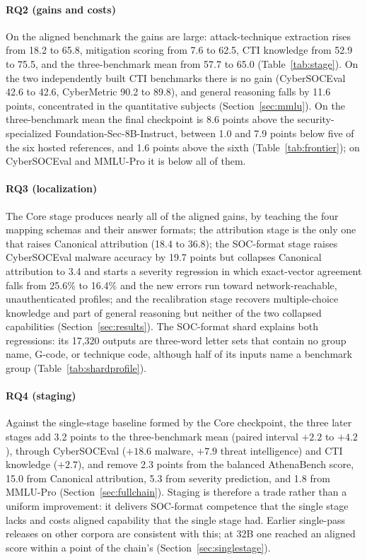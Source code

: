 \documentclass[twocolumn]{svjour3}
\begin{document}
\paragraph{RQ2 (gains and costs)}
On the aligned benchmark the gains are large: attack-technique extraction rises from 18.2 to 65.8, mitigation scoring from 7.6 to 62.5, CTI knowledge from 52.9 to 75.5, and the three-benchmark mean from 57.7 to 65.0 (Table~\ref{tab:stage}). On the two independently built CTI benchmarks there is no gain (CyberSOCEval 42.6 to 42.6, CyberMetric 90.2 to 89.8), and general reasoning falls by 11.6 points, concentrated in the quantitative subjects (Section~\ref{sec:mmlu}). On the three-benchmark mean the final checkpoint is 8.6 points above the security-specialized Foundation-Sec-8B-Instruct, between 1.0 and 7.9 points below five of the six hosted references, and 1.6 points above the sixth (Table~\ref{tab:frontier}); on CyberSOCEval and MMLU-Pro it is below all of them.

\paragraph{RQ3 (localization)}
The Core stage produces nearly all of the aligned gains, by teaching the four mapping schemas and their answer formats; the attribution stage is the only one that raises Canonical attribution (18.4 to 36.8); the SOC-format stage raises CyberSOCEval malware accuracy by 19.7 points but collapses Canonical attribution to 3.4 and starts a severity regression in which exact-vector agreement falls from 25.6\% to 16.4\% and the new errors run toward network-reachable, unauthenticated profiles; and the recalibration stage recovers multiple-choice knowledge and part of general reasoning but neither of the two collapsed capabilities (Section~\ref{sec:results}). The SOC-format shard explains both regressions: its 17,320 outputs are three-word letter sets that contain no group name, G-code, or technique code, although half of its inputs name a benchmark group (Table~\ref{tab:shardprofile}).

\paragraph{RQ4 (staging)}
Against the single-stage baseline formed by the Core checkpoint, the three later stages add 3.2 points to the three-benchmark mean (paired interval $+2.2$ to $+4.2$), through CyberSOCEval ($+18.6$ malware, $+7.9$ threat intelligence) and CTI knowledge ($+2.7$), and remove 2.3 points from the balanced AthenaBench score, 15.0 from Canonical attribution, 5.3 from severity prediction, and 1.8 from MMLU-Pro (Section~\ref{sec:fullchain}). Staging is therefore a trade rather than a uniform improvement: it delivers SOC-format competence that the single stage lacks and costs aligned capability that the single stage had. Earlier single-pass releases on other corpora are consistent with this; at 32B one reached an aligned score within a point of the chain's (Section~\ref{sec:singlestage}).
\end{document}

